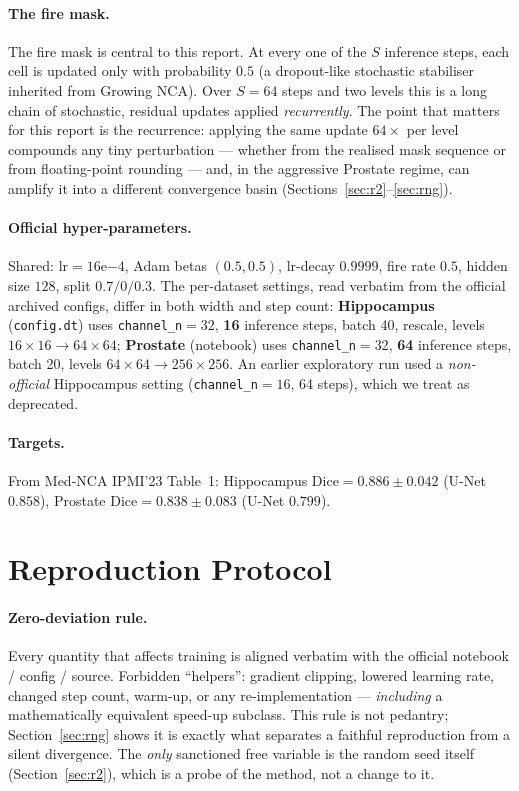 \documentclass[10pt,twocolumn]{article}
\newcommand{\dice}{\mathrm{Dice}}
\begin{document}
\paragraph{The fire mask.}
The fire mask is central to this report. At every one of the $S$ inference
steps, each cell is updated only with probability $0.5$ (a dropout-like
stochastic stabiliser inherited from Growing NCA). Over $S=64$ steps and
two levels this is a long chain of stochastic, residual updates applied
\emph{recurrently}. The point that matters for this report is the
recurrence: applying the same update $64\times$ per level compounds any tiny
perturbation --- whether from the realised mask sequence or from
floating-point rounding --- and, in the aggressive Prostate regime, can
amplify it into a different convergence basin
(Sections~\ref{sec:r2}--\ref{sec:rng}).

\paragraph{Official hyper-parameters.}
Shared: $\text{lr}=16\mathrm{e}{-4}$, Adam betas $(0.5,0.5)$, lr-decay
$0.9999$, fire rate $0.5$, hidden size $128$, split $0.7/0/0.3$. The
per-dataset settings, read verbatim from the official archived configs,
differ in both width and step count:
\textbf{Hippocampus} (\texttt{config.dt}) uses \texttt{channel\_n}$=32$,
\textbf{16} inference steps, batch 40, rescale, levels
$16{\times}16\!\rightarrow\!64{\times}64$;
\textbf{Prostate} (notebook) uses \texttt{channel\_n}$=32$, \textbf{64}
inference steps, batch 20, levels
$64{\times}64\!\rightarrow\!256{\times}256$. An earlier exploratory run
used a \emph{non-official} Hippocampus setting (\texttt{channel\_n}$=16$,
64 steps), which we treat as deprecated.

\paragraph{Targets.}
From Med-NCA IPMI'23 Table~1: Hippocampus $\dice = 0.886 \pm 0.042$
(U-Net $0.858$), Prostate $\dice = 0.838 \pm 0.083$ (U-Net $0.799$).

\section{Reproduction Protocol}
\label{sec:protocol}

\paragraph{Zero-deviation rule.}
Every quantity that affects training is aligned verbatim with the official
notebook / config / source. Forbidden ``helpers'': gradient clipping,
lowered learning rate, changed step count, warm-up, or any
re-implementation --- \emph{including} a mathematically equivalent speed-up
subclass. This rule is not pedantry; Section~\ref{sec:rng} shows it is
exactly what separates a faithful reproduction from a silent divergence.
The \emph{only} sanctioned free variable is the random seed itself
(Section~\ref{sec:r2}), which is a probe of the method, not a change to it.
\end{document}
